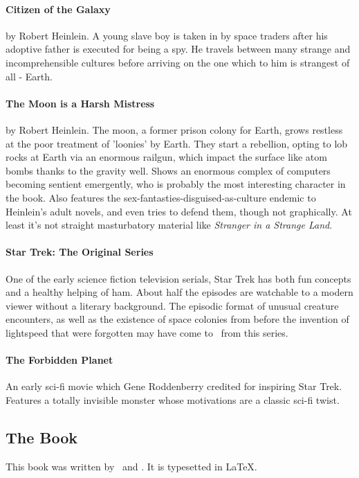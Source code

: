 \paragraph{Citizen of the Galaxy}
by Robert Heinlein. A young slave boy is taken in by space traders after his adoptive father is executed for being a spy. He travels between many strange and incomprehensible cultures before arriving on the one which to him is strangest of all - Earth.

\paragraph{The Moon is a Harsh Mistress}
by Robert Heinlein. The moon, a former prison colony for Earth, grows restless at the poor treatment of 'loonies' by Earth. They start a rebellion, opting to lob rocks at Earth via an enormous railgun, which impact the surface like atom bombs thanks to the gravity well. Shows an enormous complex of computers becoming sentient emergently, who is probably the most interesting character in the book. Also features the sex-fantasties-disguised-as-culture endemic to Heinlein's adult novels, and even tries to defend them, though not graphically. {\tiny At least it's not straight masturbatory material like \textit{Stranger in a Strange Land}.}

\paragraph{Star Trek: The Original Series}
One of the early science fiction television serials, Star Trek has both fun concepts and a healthy helping of ham. About half the episodes are watchable to a modern viewer without a literary background. The episodic format of unusual creature encounters, as well as the existence of space colonies from before the invention of lightspeed that were forgotten may have come to \getTitle\, from this series.

\paragraph{The Forbidden Planet}
An early sci-fi movie which Gene Roddenberry credited for inspiring Star Trek. Features a totally invisible monster whose motivations are a classic sci-fi twist.

\subsection{The Book}
This book was written by \zandy\, and \sam . It is typesetted in \LaTeX .

